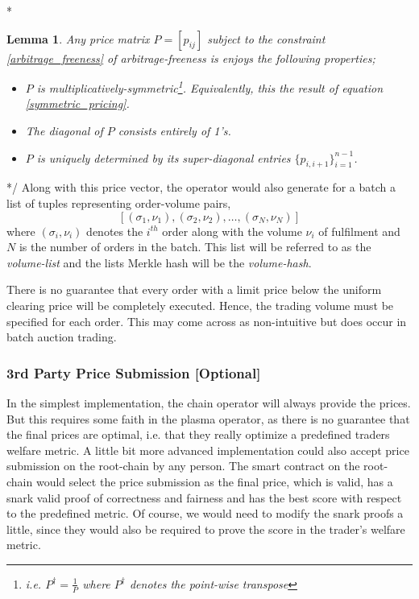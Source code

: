 \documentclass[11pt,parskip=full]{scrartcl}%
\newtheorem{lemma}[theorem]{Lemma}
\begin{document}
\/* 
\begin{lemma}
Any price matrix $P = [p_{ij}]$ subject to the constraint \ref{arbitrage_freeness} of arbitrage-freeness is enjoys the following properties;
\begin{itemize}
\item[(i)] $P$ is multiplicatively-symmetric\footnote{i.e. $P^\dagger = \frac{1}{P}$ where $P^\dagger$ denotes the point-wise transpose}. Equivalently, this the result of equation \ref{symmetric_pricing}.
\item[(ii)] The diagonal of $P$ consists entirely of 1's.
\item[(iii)]  $P$ is uniquely determined by its super-diagonal entries $\{p_{i, i+1}\}_{i=1}^{n-1}$.
\end{itemize}
\end{lemma}
*/
Along with this price vector, the operator would also generate for a batch a list of tuples representing order-volume pairs, 
\[[(\sigma_1, \nu_1), (\sigma_2,  \nu_2), \dots, (\sigma_N, \nu_N)]\]
where $(\sigma_i, \nu_i)$ denotes the $i^{th}$ order along with the volume $\nu_i$ of fulfilment and $N$ is the number of orders in the batch. 
This list will be referred to as the \emph{volume-list}\label{volumeBlock} and the lists Merkle hash will be the \emph{volume-hash}.

There is no guarantee that every order with a limit price below the uniform clearing price will be completely executed. Hence, the trading volume must be specified for each order.
This may come across as non-intuitive but does occur in batch auction trading.

\subsubsection*{3rd Party Price Submission [Optional]}
\label{publicPrices}
In the simplest implementation, the chain operator will always provide the prices. But this requires some faith in the plasma operator, as there is no guarantee that the final prices are optimal, i.e. that they really optimize a predefined traders welfare metric.
A little bit more advanced implementation could also accept price submission on the root-chain by any person. 
The smart contract on the root-chain would select the price submission as the final price, which is valid, has a snark valid proof of correctness and fairness and has the best score with respect to the predefined metric. Of course, we would need to modify the snark proofs a little, since they would also be required to prove the score in the trader's welfare metric. 
\end{document}
